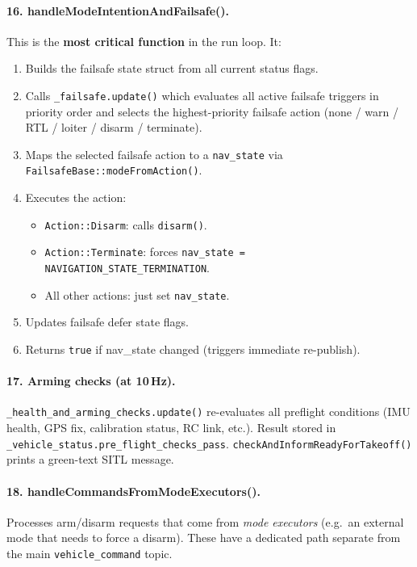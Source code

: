 \documentclass[12pt,a4paper]{article}
\begin{document}
\paragraph{16. handleModeIntentionAndFailsafe().}
This is the \textbf{most critical function} in the run loop.
It:
\begin{enumerate}
  \item Builds the failsafe state struct from all current status flags.
  \item Calls \texttt{\_failsafe.update()} which evaluates all active
        failsafe triggers in priority order and selects the highest-priority
        failsafe action (none / warn / RTL / loiter / disarm / terminate).
  \item Maps the selected failsafe action to a \texttt{nav\_state} via
        \texttt{FailsafeBase::modeFromAction()}.
  \item Executes the action:
        \begin{itemize}
          \item \texttt{Action::Disarm}: calls \texttt{disarm()}.
          \item \texttt{Action::Terminate}: forces
                \texttt{nav\_state = NAVIGATION\_STATE\_TERMINATION}.
          \item All other actions: just set \texttt{nav\_state}.
        \end{itemize}
  \item Updates failsafe defer state flags.
  \item Returns \texttt{true} if nav\_state changed (triggers immediate re-publish).
\end{enumerate}

\paragraph{17. Arming checks (at 10\,Hz).}
\texttt{\_health\_and\_arming\_checks.update()} re-evaluates all preflight
conditions (IMU health, GPS fix, calibration status, RC link, etc.).
Result stored in \texttt{\_vehicle\_status.pre\_flight\_checks\_pass}.
\texttt{checkAndInformReadyForTakeoff()} prints a green-text SITL message.

\paragraph{18. handleCommandsFromModeExecutors().}
Processes arm/disarm requests that come from \emph{mode executors}
(e.g.\ an external mode that needs to force a disarm). These have a
dedicated path separate from the main \texttt{vehicle\_command} topic.
\end{document}
